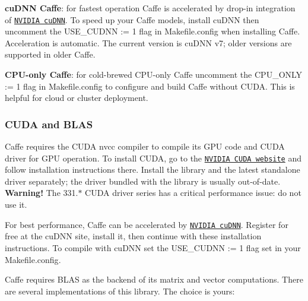 {\bfseries cu\+D\+NN Caffe}\+: for fastest operation Caffe is accelerated by drop-\/in integration of \href{https://developer.nvidia.com/cudnn}{\tt N\+V\+I\+D\+IA cu\+D\+NN}. To speed up your Caffe models, install cu\+D\+NN then uncomment the {\ttfamily U\+S\+E\+\_\+\+C\+U\+D\+NN \+:= 1} flag in {\ttfamily Makefile.\+config} when installing Caffe. Acceleration is automatic. The current version is cu\+D\+NN v7; older versions are supported in older Caffe.

{\bfseries C\+P\+U-\/only Caffe}\+: for cold-\/brewed C\+P\+U-\/only Caffe uncomment the {\ttfamily C\+P\+U\+\_\+\+O\+N\+LY \+:= 1} flag in {\ttfamily Makefile.\+config} to configure and build Caffe without C\+U\+DA. This is helpful for cloud or cluster deployment.

\subsubsection*{C\+U\+DA and B\+L\+AS}

Caffe requires the C\+U\+DA {\ttfamily nvcc} compiler to compile its G\+PU code and C\+U\+DA driver for G\+PU operation. To install C\+U\+DA, go to the \href{https://developer.nvidia.com/cuda-downloads}{\tt N\+V\+I\+D\+IA C\+U\+DA website} and follow installation instructions there. Install the library and the latest standalone driver separately; the driver bundled with the library is usually out-\/of-\/date. {\bfseries Warning!} The 331.$\ast$ C\+U\+DA driver series has a critical performance issue\+: do not use it.

For best performance, Caffe can be accelerated by \href{https://developer.nvidia.com/cudnn}{\tt N\+V\+I\+D\+IA cu\+D\+NN}. Register for free at the cu\+D\+NN site, install it, then continue with these installation instructions. To compile with cu\+D\+NN set the {\ttfamily U\+S\+E\+\_\+\+C\+U\+D\+NN \+:= 1} flag set in your {\ttfamily Makefile.\+config}.

Caffe requires B\+L\+AS as the backend of its matrix and vector computations. There are several implementations of this library. The choice is yours\+:


